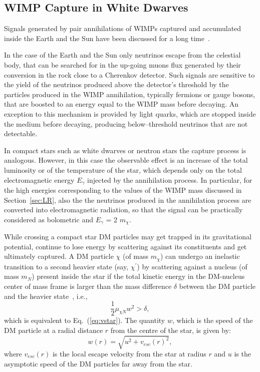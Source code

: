 \documentclass[11pt]{article}
\begin{document}
\subsection{WIMP Capture in White Dwarves}
\label{sec:capture_in_wd}

Signals generated by pair annihilations of WIMPs captured and accumulated inside the Earth and the Sun have been discussed for a 
long time~\cite{capture_Press_Spergel, capture_Gould_1987ApJ, capture_Gould_1988ApJ, gould_capture_1991}. 

In the case of the Earth and the Sun only neutrinos escape from the celestial body, that can be searched for in the up-going muons flux generated by their conversion in the rock close to a Cherenkov detector. Such signals are sensitive to the yield of the neutrinos produced above the detector's threshold by the particles produced in the WIMP annihilation, typically fermions or gauge bosons, that are boosted to an energy equal to the WIMP mass before decaying. An exception to this mechanism is provided by light quarks, which are stopped inside the medium before decaying, producing below--threshold neutrinos that are not detectable. 

In compact stars such as white dwarves or neutron stars the capture process is analogous. However, in this case the observable effect is an increase of the total luminosity or of the temperature of the star, which depends only on the total electromagnetic energy $E_\gamma$ injected by the annihilation process. 
In particular, for the high energies corresponding to the values of the WIMP mass discussed in Section~\ref{sec:LR}, also the the neutrinos produced in the annihilation process are converted into electromagnetic radiation, so that the signal can be practically considered as bolometric and $E_\gamma$ = 2 $m_\chi$.


While crossing a compact star DM particles may get trapped in its gravitational potential, continue to lose energy by scattering against its constituents and get ultimately captured. A DM particle $\chi$ (of mass $m_{\chi}$) can undergo an inelastic transition to a second heavier state (say, $\chi^{\prime}$) by scattering 
against a nucleus (of mass $m_N$) present inside the star if the total kinetic energy in the DM-nucleus center of mass frame is larger than the mass difference $\delta$ between the DM 
particle and the heavier state~\cite{idm_sun_Nussinov_2009, idm_sun_Menon_2009, idm_sun_Shu_2010, idm_sun_Catena_2018}, i.e.,
\begin{equation}
\frac{1}{2} \mu_{\chi N} w^2 > \delta,
\label{eq:KE_condition}
\end{equation}
\noindent which is equivalent to Eq.~(\ref{eq:vstar}). The quantity $w$, which is the speed of the DM particle at a radial distance $r$ from the centre of the star, is given by:
\begin{equation}
w(r) = \sqrt{u^2 + v_{esc}(r)^2},
\end{equation}
where $v_{esc}(r)$ is the local escape velocity from the star at radius $r$ and $u$ is the asymptotic 
speed of the DM particles far away from the star. 
\end{document}
